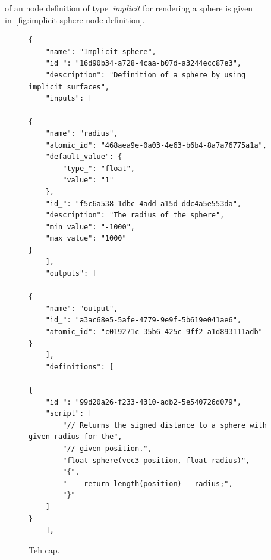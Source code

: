 \documentclass[%
    a4paper,    %
    justified,  %
    nobib,      %
    openany     %
]{tufte-book}
\begin{document}
 of an node definition of type~\emph{implicit} for
rendering a sphere is given in~\autoref{fig:implicit-sphere-node-definition}.
\begin{figure}
  \begin{verbatim}
{
    "name": "Implicit sphere",
    "id_": "16d90b34-a728-4caa-b07d-a3244ecc87e3",
    "description": "Definition of a sphere by using implicit surfaces",
    "inputs": [
        
{
    "name": "radius",
    "atomic_id": "468aea9e-0a03-4e63-b6b4-8a7a76775a1a",
    "default_value": {
        "type_": "float",
        "value": "1"
    },
    "id_": "f5c6a538-1dbc-4add-a15d-ddc4a5e553da",
    "description": "The radius of the sphere",
    "min_value": "-1000",
    "max_value": "1000"
}
    ],
    "outputs": [
        
{
    "name": "output",
    "id_": "a3ac68e5-5afe-4779-9e9f-5b619e041ae6",
    "atomic_id": "c019271c-35b6-425c-9ff2-a1d893111adb"
}
    ],
    "definitions": [
        
{
    "id_": "99d20a26-f233-4310-adb2-5e540726d079",
    "script": [
        "// Returns the signed distance to a sphere with given radius for the",
        "// given position.",
        "float sphere(vec3 position, float radius)",
        "{",
        "    return length(position) - radius;",
        "}"
    ]
}
    ],
  \end{verbatim}
  \label{fig:node-definition-atomic-type}
  \caption{Teh cap.}
\end{figure}
\end{document}

